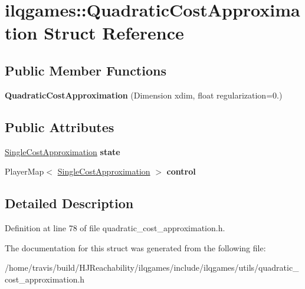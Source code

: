 \hypertarget{structilqgames_1_1_quadratic_cost_approximation}{}\section{ilqgames\+:\+:Quadratic\+Cost\+Approximation Struct Reference}
\label{structilqgames_1_1_quadratic_cost_approximation}
\subsection*{Public Member Functions}
\begin{DoxyCompactItemize}
\item 
{\bfseries Quadratic\+Cost\+Approximation} (Dimension xdim, float regularization=0.)\hypertarget{structilqgames_1_1_quadratic_cost_approximation_a0722ad542477052b0a489ead01165e16}{}\label{structilqgames_1_1_quadratic_cost_approximation_a0722ad542477052b0a489ead01165e16}

\end{DoxyCompactItemize}
\subsection*{Public Attributes}
\begin{DoxyCompactItemize}
\item 
\hyperlink{structilqgames_1_1_single_cost_approximation}{Single\+Cost\+Approximation} {\bfseries state}\hypertarget{structilqgames_1_1_quadratic_cost_approximation_a9a1ba94f8eb8f4c7bf22233feab63b15}{}\label{structilqgames_1_1_quadratic_cost_approximation_a9a1ba94f8eb8f4c7bf22233feab63b15}

\item 
Player\+Map$<$ \hyperlink{structilqgames_1_1_single_cost_approximation}{Single\+Cost\+Approximation} $>$ {\bfseries control}\hypertarget{structilqgames_1_1_quadratic_cost_approximation_af5713bb905716d24ebdd581d48add80a}{}\label{structilqgames_1_1_quadratic_cost_approximation_af5713bb905716d24ebdd581d48add80a}

\end{DoxyCompactItemize}


\subsection{Detailed Description}


Definition at line 78 of file quadratic\+\_\+cost\+\_\+approximation.\+h.



The documentation for this struct was generated from the following file\+:\begin{DoxyCompactItemize}
\item 
/home/travis/build/\+H\+J\+Reachability/ilqgames/include/ilqgames/utils/quadratic\+\_\+cost\+\_\+approximation.\+h\end{DoxyCompactItemize}

